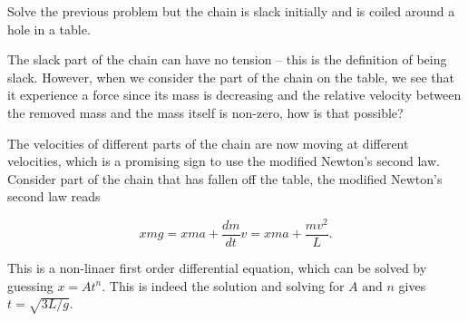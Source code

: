 \documentclass[a4paper,12pt]{report}
\begin{document}
{Solve the previous problem but the chain is slack initially and is coiled around a hole in a table.}
{The slack part of the chain can have no tension -- this is the definition of being slack. However, when we consider the part of the chain on the table, we see that it experience a force since its mass is decreasing and the relative velocity between the removed mass and the mass itself is non-zero, how is that possible? 

The velocities of different parts of the chain are now moving at different velocities, which is a promising sign to use the modified Newton's second law. Consider part of the chain that has fallen off the table, the modified Newton's second law reads

\begin{equation}
	xmg = xma + \frac{dm}{dt}v = xma + \frac{mv^2}{L}.
\end{equation}

This is a non-linaer first order differential equation, which can be solved by guessing \(x = At^{n} \). This is indeed the solution and solving for \(A \text { and }  n\) gives \(t = \sqrt{3L /g} \).

} 
\end{document}
